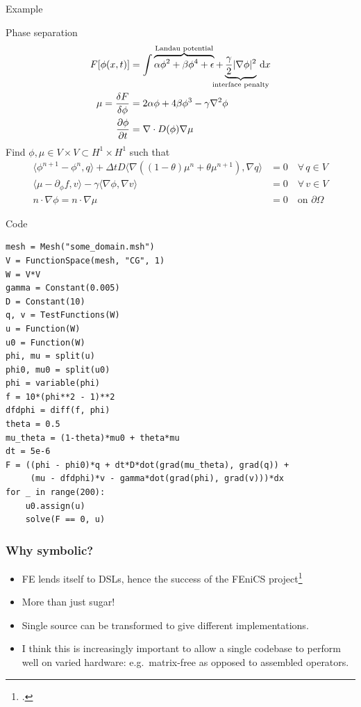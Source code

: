\documentclass[presentation]{beamer}
\begin{document}
\begin{frame}{Example}
\begin{block}{Phase separation}
{\scriptsize \begin{equation*}
\begin{aligned}
F[\phi(x, t)] &= \int \overbrace{\alpha \phi^2 + \beta \phi^4 + \epsilon}^{\mathclap{\text{Landau potential}}} + \underbrace{\frac{\gamma}{2} |\nabla\phi|^2}_{\mathclap{\text{interface penalty}}}\,\mathrm{d}x\\
\mu = \frac{\delta F}{\delta \phi} &= 2\alpha\phi + 4\beta\phi^3 - \gamma\nabla^2\phi\\
\frac{\partial \phi}{\partial t} &= \nabla \cdot D(\phi) \nabla \mu
\end{aligned}
\end{equation*}
}
Find $\phi, \mu \in V \times V \subset H^1 \times H^1$ such that
{\scriptsize \begin{equation*}
\begin{aligned}
\langle \phi^{n+1} - \phi^n, q \rangle + \Delta t D \langle \nabla ((1 - \theta)\mu^{n} + \theta \mu^{n+1}), \nabla q \rangle &= 0 \quad \forall\, q \in V\\
\langle \mu - \partial_\phi f, v \rangle - \gamma \langle \nabla \phi, \nabla v \rangle &= 0 \quad \forall\, v \in V\\
n\cdot\nabla \phi = n\cdot\nabla \mu &= 0 \quad\text{on $\partial\Omega$}
\end{aligned}
\end{equation*}
}
\end{block}
\end{frame}
\begin{frame}[fragile]{Code}
 \begin{verbatim}
mesh = Mesh("some_domain.msh")
V = FunctionSpace(mesh, "CG", 1)
W = V*V
gamma = Constant(0.005)
D = Constant(10)
q, v = TestFunctions(W)
u = Function(W)
u0 = Function(W)
phi, mu = split(u)
phi0, mu0 = split(u0)
phi = variable(phi)
f = 10*(phi**2 - 1)**2
dfdphi = diff(f, phi)
theta = 0.5
mu_theta = (1-theta)*mu0 + theta*mu
dt = 5e-6
F = ((phi - phi0)*q + dt*D*dot(grad(mu_theta), grad(q)) +
     (mu - dfdphi)*v - gamma*dot(grad(phi), grad(v)))*dx
for _ in range(200):
    u0.assign(u)
    solve(F == 0, u)
\end{verbatim}
\end{frame}
\begin{frame}
  \frametitle{Why symbolic?}
  \begin{itemize}
  \item FE lends itself to DSLs, hence the success of the FEniCS
    project\footcite{Logg:2012}
  \item More than just sugar!
  \item Single source can be transformed to give different
    implementations.
  \item I think this is increasingly important to allow a single
    codebase to perform well on varied hardware: e.g.\ matrix-free as
    opposed to assembled operators.
  \end{itemize}
\end{frame}
\end{document}
